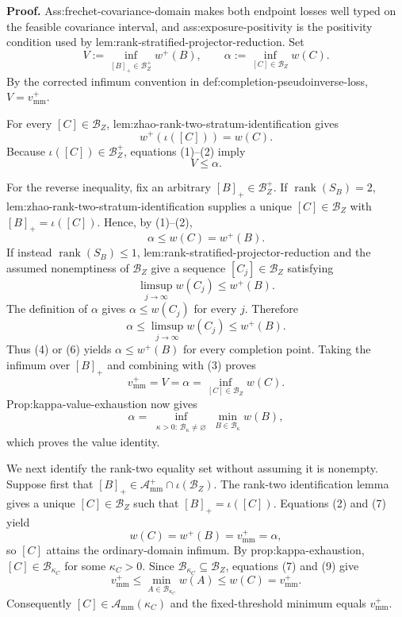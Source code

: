 \textbf{Proof.}
Ass:frechet-covariance-domain makes both endpoint losses well typed on the feasible covariance interval, and ass:exposure-positivity is the positivity condition used by lem:rank-stratified-projector-reduction.  Set
\[
V:=\inf_{[B]_+\in\mathcal B_Z^+}w^+(B),
\qquad
\alpha:=\inf_{[C]\in\mathcal B_Z}w(C).
\tag{1}
\]
By the corrected infimum convention in def:completion-pseudoinverse-loss, \(V=v_{\mathrm{mm}}^+\).

For every \([C]\in\mathcal B_Z\), lem:zhao-rank-two-stratum-identification gives
\[
w^+(\iota([C]))=w(C).
\tag{2}
\]
Because \(\iota([C])\in\mathcal B_Z^+\), equations (1)--(2) imply
\[
V\le \alpha.
\tag{3}
\]

For the reverse inequality, fix an arbitrary \([B]_+\in\mathcal B_Z^+\).  If \(\operatorname{rank}(S_B)=2\), lem:zhao-rank-two-stratum-identification supplies a unique \([C]\in\mathcal B_Z\) with \([B]_+=\iota([C])\).  Hence, by (1)--(2),
\[
\alpha\le w(C)=w^+(B).
\tag{4}
\]
If instead \(\operatorname{rank}(S_B)\le1\), lem:rank-stratified-projector-reduction and the assumed nonemptiness of \(\mathcal B_Z\) give a sequence \([C_j]\in\mathcal B_Z\) satisfying
\[
\limsup_{j\to\infty}w(C_j)\le w^+(B).
\tag{5}
\]
The definition of \(\alpha\) gives \(\alpha\le w(C_j)\) for every \(j\).  Therefore
\[
\alpha\le\limsup_{j\to\infty}w(C_j)\le w^+(B).
\tag{6}
\]
Thus (4) or (6) yields \(\alpha\le w^+(B)\) for every completion point.  Taking the infimum over \([B]_+\) and combining with (3) proves
\[
v_{\mathrm{mm}}^+=V=\alpha
=\inf_{[C]\in\mathcal B_Z}w(C).
\tag{7}
\]
Prop:kappa-value-exhaustion now gives
\[
\alpha
=\inf_{\substack{\kappa>0:\,\mathcal B_\kappa\ne\varnothing}}
\min_{B\in\mathcal B_\kappa}w(B),
\tag{8}
\]
which proves the value identity.

We next identify the rank-two equality set without assuming it is nonempty.  Suppose first that
\([B]_+\in\mathcal A_{\mathrm{mm}}^+\cap\iota(\mathcal B_Z)\).  The rank-two identification lemma gives a unique \([C]\in\mathcal B_Z\) such that \([B]_+=\iota([C])\).  Equations (2) and (7) yield
\[
w(C)=w^+(B)=v_{\mathrm{mm}}^+=\alpha,
\tag{9}
\]
so \([C]\) attains the ordinary-domain infimum.  By prop:kappa-exhaustion, \([C]\in\mathcal B_{\kappa_C}\) for some \(\kappa_C>0\).  Since \(\mathcal B_{\kappa_C}\subseteq\mathcal B_Z\), equations (7) and (9) give
\[
v_{\mathrm{mm}}^+
\le \min_{A\in\mathcal B_{\kappa_C}}w(A)
\le w(C)
=v_{\mathrm{mm}}^+.
\tag{10}
\]
Consequently \([C]\in\mathcal A_{\mathrm{mm}}(\kappa_C)\) and the fixed-threshold minimum equals \(v_{\mathrm{mm}}^+\).

